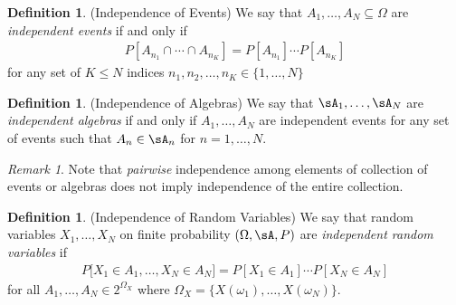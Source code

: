 \documentclass[12pt]{article}
\theoremstyle{plain}
\theoremstyle{definition}
\newtheorem{defn}[thm]{Definition}
\newtheorem{ex}[thm]{Example}
\theoremstyle{remark}
\newtheorem*{rmk}{Remark}
\begin{document}
\begin{defn}(Independence of Events)
We say that $A_1,\ldots,A_N\subseteq \Omega$ are
\emph{independent events} if and only if
\begin{align*}
  P[A_{n_1}\cap \cdots \cap A_{n_K}] =
  P[A_{n_1}]\cdots P[A_{n_K}]
\end{align*}
for any set of $K\leq N$ indices $n_1,n_2,\ldots,n_K\in\{1,\ldots,N\}$
\end{defn}

\begin{defn}(Independence of Algebras)
We say that $\sA_1,\ldots,\sA_N$ are \emph{independent algebras} if and
only if $A_1,\ldots,A_N$ are independent events for any set of events
such that $A_n\in\sA_n$ for $n=1,\ldots,N$.
\end{defn}

\begin{rmk}
Note that \emph{pairwise} independence among elements of collection of
events or algebras does not imply independence of the entire collection.
\end{rmk}

\begin{defn}(Independence of Random Variables)
We say that random variables $X_1,\ldots,X_N$ on finite probability
$(\Omega,\sA,P)$ are \emph{independent random variables} if
\begin{align*}
  P\big[
    X_1\in A_1,\ldots,X_N\in A_N
  \big]
  =
  P[X_1\in A_1] \cdots P[X_N\in A_N]
\end{align*}
for all $A_1,\ldots,A_N\in 2^{\Omega_X}$ where
$\Omega_X=\{X(\omega_1),\ldots,X(\omega_N)\}$.
\end{defn}






\end{document}
